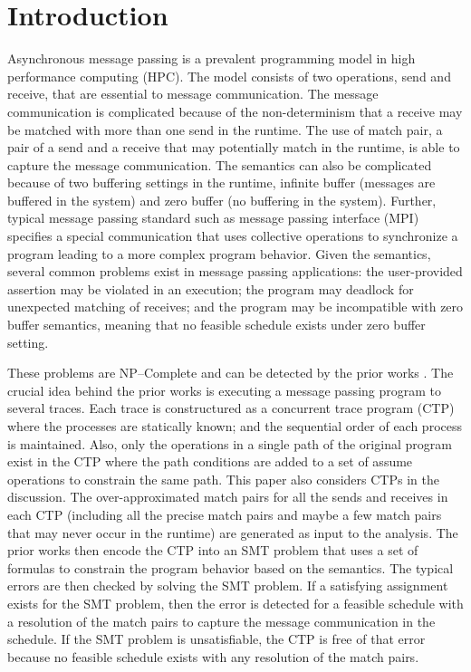  \section{Introduction}
Asynchronous message passing is a prevalent programming model in high performance computing (HPC). The model consists of two operations, send and receive, that are essential to message communication. The message communication is complicated because of the non-determinism that a receive may be matched with more than one send in the runtime. The use of match pair, a pair of a send and a receive that may potentially match in the runtime, is able to capture the message communication.
The semantics can also be complicated because of two buffering settings in the runtime, infinite buffer (messages are buffered in the system) and zero buffer (no buffering in the system). Further, typical message passing standard such as message passing interface (MPI) specifies a special communication that uses collective operations to synchronize a program leading to a more complex program behavior. 
Given the semantics, several common problems exist in message passing applications: the user-provided assertion may be violated in an execution; the program may deadlock for unexpected matching of receives; and the program may be incompatible with zero buffer semantics, meaning that no feasible schedule exists under zero buffer setting. 

These problems are NP--Complete and can be detected by the prior works \cite{DBLP:conf/kbse/HuangMM13,HuangNFM15,HuangDeadlock}. The crucial idea behind the prior works is executing a message passing program to several traces. Each trace is constructured as a concurrent trace program (CTP) where the processes are statically known; and the sequential order of each process is maintained. Also, only the operations in a single path of the original program exist in the CTP where the path conditions are added to a set of assume operations to constrain the same path. This paper also considers CTPs in the discussion. The over-approximated match pairs for all the sends and receives in each CTP (including all the precise match pairs and maybe a few match pairs that may never occur in the runtime) are generated as input to the analysis. The prior works then encode the CTP into an SMT problem that uses a set of formulas to constrain the program behavior based on the semantics. The typical errors are then checked by solving the SMT problem. If a satisfying assignment exists for the SMT problem, then the error is detected for a feasible schedule with a resolution of the match pairs to capture the message communication in the schedule. If the SMT problem is unsatisfiable, the CTP is free of that error because no feasible schedule exists with any resolution of the match pairs. 

